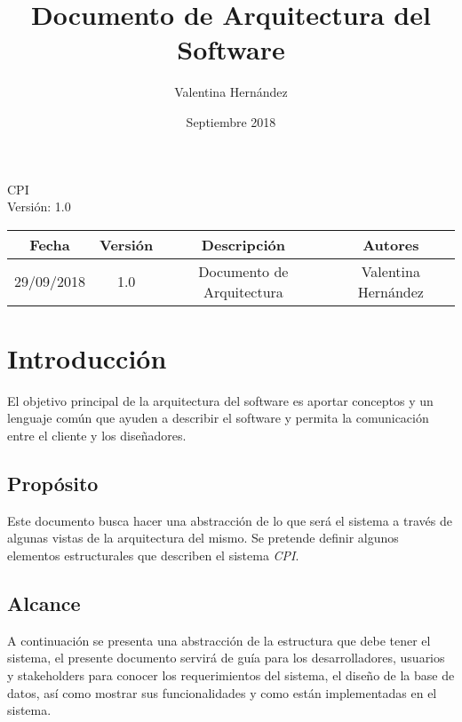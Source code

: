 \documentclass{article}
\title{Documento de Arquitectura del Software} \let\Title\@title
\date{Septiembre 2018} \let\Date\@date
\author{Valentina Hernández} \let\Author\@author
\begin{document}
    \begin{titlepage}
        \huge{\Title}
        \begin{flushright}
            \Large{CPI \\ Versión: 1.0}
        \end{flushright}
    \end{titlepage}

    \restoregeometry

    \newpage
    \tableofcontents

    \newpage
    \begin{center}
        \begin{tabular}{ |c|c|c|c| }
            \hline
            \rowcolor{gray!30}
            Fecha & Versión & Descripción & Autores \\ [0.5ex]
            \hline\hline
            29/09/2018 & 1.0 & Documento de Arquitectura & Valentina Hernández \\
            \hline
        \end{tabular}
    \end{center}

    \newpage
    \section{Introducción}
    El objetivo principal de la arquitectura del software es aportar conceptos y un lenguaje común que ayuden a describir el software y permita la comunicación entre el cliente y los diseñadores.

    \subsection{Propósito}
    Este documento busca hacer una abstracción de lo que será el sistema a través de algunas vistas de la arquitectura del mismo. Se pretende definir algunos elementos estructurales que describen el sistema \emph{CPI}.

    \subsection{Alcance}
    A continuación se presenta una abstracción de la estructura que debe tener el sistema, el presente documento servirá de guía para los desarrolladores, usuarios y stakeholders para conocer los requerimientos del sistema, el diseño de la base de datos, así como mostrar sus funcionalidades y como están implementadas en el sistema. 
 
\end{document}
